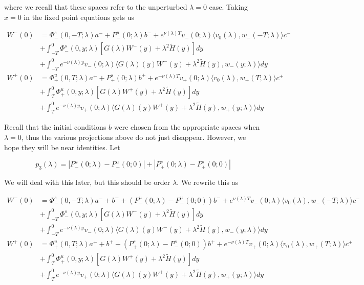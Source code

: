 \documentclass[12pt]{article}
\begin{document}
\begin{enumerate}
where we recall that these spaces refer to the unperturbed $\lambda = 0$ case. Taking $x = 0$ in the fixed point equations gets us

\begin{align*}
W^-(0) &= \Phi^s_-(0, -T; \lambda)a^- + P^u_-(0; \lambda)b^- + e^{\nu(\lambda)T} v_-(0; \lambda) \langle v_0(\lambda), w_-(-T; \lambda) \rangle c^- \\
&+ \int_{-T}^0 \Phi^s_-(0, y; \lambda) [ G(\lambda)W^-(y) + \lambda^2 \tilde{H}(y) ] dy \\
&+ \int_{-T}^0 
e^{-\nu(\lambda)y} v_-(0; \lambda) \langle G(\lambda)(y)W^-(y) + \lambda^2 \tilde{H}(y), w_-(y; \lambda) \rangle dy \\
W^+(0) &= \Phi^u_+(0, T; \lambda)a^+ + P^s_+(0; \lambda)b^+ + e^{-\nu(\lambda)T} v_+(0; \lambda) \langle v_0(\lambda), w_+(T; \lambda) \rangle c^+ \\
&+ \int_T^0 \Phi^u_+(0, y; \lambda) [ G(\lambda)W^+(y) + \lambda^2 \tilde{H}(y) ] dy \\
&+ \int_T^0 e^{-\nu(\lambda)y} v_+(0; \lambda) \langle G(\lambda)(y)W^+(y) + \lambda^2 \tilde{H}(y), w_+(y; \lambda) \rangle dy
\end{align*}

Recall that the initial conditions $b$ were chosen from the appropriate spaces when $\lambda = 0$, thus the various projections above do not just disappear. However, we hope they will be near identities. Let

\[
p_3(\lambda) = |P^u_-(0;\lambda) - P^u_-(0; 0)| + |P^s_+(0;\lambda) - P^s_+(0;0)|
\]

We will deal with this later, but this should be order $\lambda$. We rewrite this as

\begin{align*}
W^-(0) &= \Phi^s_-(0, -T; \lambda )a^- + b^- + (P^u_-(0; \lambda) - P^u_-(0; 0))b^- + e^{\nu(\lambda)T} v_-(0; \lambda) \langle v_0(\lambda), w_-(-T; \lambda) \rangle c^- \\
&+ \int_{-T}^0 \Phi^s_-(0, y; \lambda) [ G(\lambda)W^-(y) + \lambda^2 \tilde{H}(y) ] dy \\
&+ \int_{-T}^0 
e^{-\nu(\lambda)y} v_-(0; \lambda) \langle G(\lambda)(y)W^-(y) + \lambda^2 \tilde{H}(y), w_-(y; \lambda) \rangle dy \\
W^+(0) &= \Phi^u_+(0, T; \lambda)a^+ + b^+ + (P^s_+(0; \lambda) - P^s_-(0; 0))b^+ + e^{-\nu(\lambda)T} v_+(0; \lambda) \langle v_0(\lambda), w_+(T; \lambda) \rangle c^+ \\
&+ \int_T^0 \Phi^u_+(0, y; \lambda) [ G(\lambda)W^+(y) + \lambda^2 \tilde{H}(y) ] dy \\
&+ \int_T^0 e^{-\nu(\lambda)y} v_+(0; \lambda) \langle G(\lambda)(y)W^+(y) + \lambda^2 \tilde{H}(y), w_+(y; \lambda) \rangle dy
\end{align*}


\end{enumerate}
\end{document}
